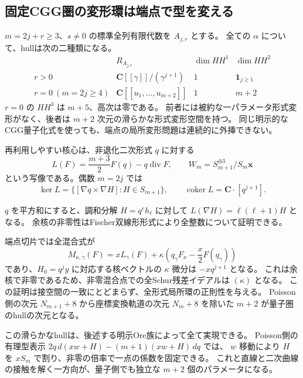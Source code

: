 \subsection{固定CGG圏の変形環は端点で型を変える}
$m=2j+r\ge3$、$s\ne0$ の標準全列有限代数を $A_{j,r}$ とする。
全ての $\alpha$ について、hullは次の二種類になる。
\[
\begin{array}{c|c|c|c}
 &R_{A_{j,r}}&\dim HH^1&\dim HH^2\\\hline
 r>0&\mathbf C[[\gamma]]/(\gamma^{j+1})&1&\mathbf1_{j\ge1}\\
 r=0\ (m=2j\ge4)&\mathbf C[[u_1,\ldots,u_{m+2}]]&1&m+2
\end{array}
\]
$r=0$ の $HH^3$ は $m+5$、高次は零である。
前者には被約な一パラメータ形式変形がなく、後者は $m+2$ 次元の滑らかな形式変形空間を持つ。
同じ明示的なCGG量子化式を使っても、端点の局所変形問題は連続的に外挿できない。

再利用しやすい核心は、非退化二次形式 $q$ に対する
\[
 L(F)=\frac{m+3}{2}F(q)-q\operatorname{div}F,
 \qquad W_m=S_{m+1}^{\oplus3}/S_m\mathbf x
\]
という写像である。偶数 $m=2j$ では
\[
 \ker L=\{[\nabla q\times\nabla H]:H\in S_{m+1}\},
 \qquad\operatorname{coker}L=\mathbf C\cdot[q^{j+1}].
\]

$q$ を平方和にすると、調和分解 $H=q^e h_\ell$ に対して
$L(\nabla H)=\ell(\ell+1)H$ となる。
余核の非零性はFischer双線形形式により全整数について証明できる。

端点切片では全混合式が
\[
 M_{\kappa,\gamma}(F)=xL_\gamma(F)
  +\kappa\left(q_\gamma F_x-\frac x2F(q_\gamma)\right)
\]
であり、$H_0=q^j y$ に対応する核ベクトルの $\kappa$ 微分は
$-xq^{j+1}$ となる。
これは余核で非零であるため、非零混合点での全Schur残差イデアルは $(\kappa)$ となる。
この証明は接空間の一致にとどまらず、全形式局所環の正則性を与える。
Poisson側の次元 $N_{m+1}+8$ から座標変換軌道の次元 $N_m+8$ を除いた
$m+2$ が量子圏のhullの次元となる。


この滑らかなhullは、後述する明示Ore族によって全て実現できる。
Poisson側の有理型表示 $2q\,d(xw+H)-(m+1)(xw+H)\,dq$ では、
$w$ 移動により $H$ を $xS_m$ で割り、非零の倍率で一点の係数を固定できる。
これと直線と二次曲線の接触を解く一方向が、量子側でも独立な $m+2$ 個のパラメータになる。
